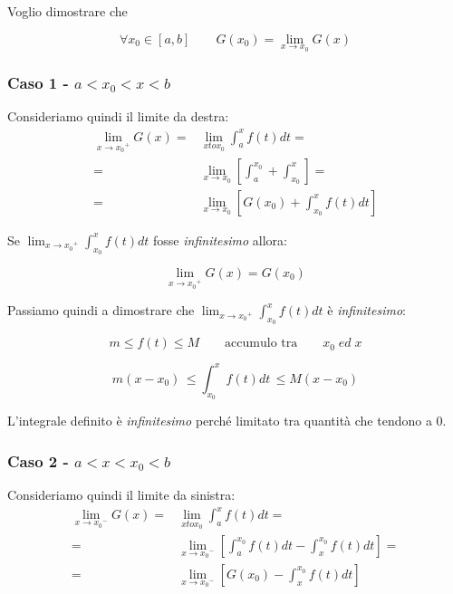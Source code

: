 \documentclass[../dimostrazioni]{subfiles}
\begin{document}
                Voglio dimostrare che 

                \[\forall x_0 \in [a, b] \qquad G(x_0) = \lim_{x \to  x_0} G(x) \]
            
                \subsubsection*{Caso 1 - \(a < x_0 < x < b \)}
                    Consideriamo quindi il limite da destra:
                    \begin{align*}
                        \lim_{x \to {x_0}^{+}}G(x) =& \lim_{x to x_0}{\int_{a}^{x}f(t) dt} = \\
                        =& \lim_{x \to x_0} \left[ \int_{a}^{x_0} + \int_{x_0}^{x} \right] = \\
                        =& \lim_{x \to x_0} \left[ G(x_0) + \int_{x_0}^{x} f(t) dt \right]
                    \end{align*}

                    Se \( \lim_{x \to {x_0}^{+}} \int_{x_0}^{x} f(t) dt \) fosse \emph{infinitesimo} allora:

                    \[  \lim_{x \to {x_0}^{+}}G(x) = G(x_0) \]

                    Passiamo quindi a dimostrare che \( \lim_{x \to {x_0}^{+}} \int_{x_0}^{x} f(t) dt \) è \emph{infinitesimo}:

                    \[m \leqslant f(t) \leqslant M \qquad \text {accumulo tra} \qquad x_0 \; ed \; x \]

                    \[m(x-x_0) \, \leqslant \int_{x_0}^{x} f(t) dt \, \leqslant M(x-x_0) \]

                    L'integrale definito è \emph{infinitesimo} perché limitato tra quantità che tendono a 0.

                
                \subsubsection*{Caso 2 - \(a < x < x_0 < b \)}
                    Consideriamo quindi il limite da sinistra:
                    \begin{align*}
                        \lim_{x \to {x_0}^{-}}G(x) =& \lim_{x to x_0}{\int_{a}^{x}f(t) dt} = \\
                        =& \lim_{x \to {x_0}^{-}} \left[ \int_{a}^{x_0}f(t) dt - \int_{x}^{x_0}f(t) dt \right] = \\
                        =& \lim_{x \to {x_0}^{-}} \left[ G(x_0) - \int_{x}^{x_0} f(t) dt \right]
                    \end{align*}
\end{document}
